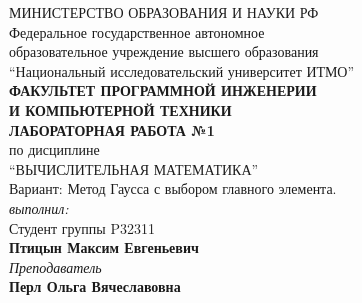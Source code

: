 \thispagestyle{empty}
\BgThispage
\begin{center}
	МИНИСТЕРСТВО ОБРАЗОВАНИЯ И НАУКИ РФ\\
	\hfill \break
	Федеральное государственное автономное\\
	образовательное учреждение высшего образования\\
	``Национальный исследовательский университет ИТМО''\\
	\hfill \break
	\textbf{ФАКУЛЬТЕТ ПРОГРАММНОЙ ИНЖЕНЕРИИ \\
	И КОМПЬЮТЕРНОЙ ТЕХНИКИ}\\
	\vspace{2cm}
	\large{\textbf{ЛАБОРАТОРНАЯ РАБОТА №1}}\\
	\hfill \break
	по дисциплине\\
		\large{``ВЫЧИСЛИТЕЛЬНАЯ МАТЕМАТИКА''}\\
	\hfill \break
	Вариант: Метод Гаусса с выбором главного элемента. \\
	\vspace{3cm}
	\textit{выполнил:}\\
	Студент группы P32311\\
	\textbf{Птицын Максим Евгеньевич}\\
	\textit{Преподаватель}\\
	\textbf{Перл Ольга Вячеславовна}
\end{center}

\thispagestyle{empty}
\newpage
